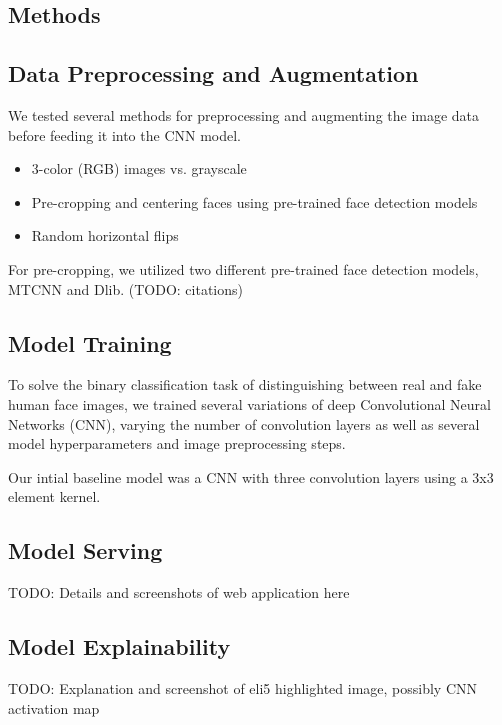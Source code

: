 \documentclass[11pt, letterpaper]{article}
\providecommand{\tightlist}{%
  \setlength{\itemsep}{0pt}\setlength{\parskip}{0pt}
}
\begin{document}
\begin{multicols}{2}
  \section{Methods}

  \subsection{Data Preprocessing and Augmentation}

  We tested several methods for preprocessing and augmenting the image data
  before feeding it into the CNN model.

  \begin{itemize}
    \tightlist
  \item 3-color (RGB) images vs. grayscale
  \item Pre-cropping and centering faces using pre-trained face detection models
  \item Random horizontal flips
  \end{itemize}

  For pre-cropping, we utilized two different pre-trained face detection models,
  MTCNN and Dlib. (TODO: citations)

  \subsection{Model Training}

  To solve the binary classification task of distinguishing between real and
  fake human face images, we trained several variations of deep Convolutional
  Neural Networks (CNN), varying the number of convolution layers as well as
  several model hyperparameters and image preprocessing steps.

  Our intial baseline model was a CNN with three convolution layers using a 3x3
  element kernel.

  \subsection{Model Serving}

  TODO: Details and screenshots of web application here

  \subsection{Model Explainability}

  TODO: Explanation and screenshot of eli5 highlighted image, possibly CNN
  activation map


\end{multicols}
\end{document}
